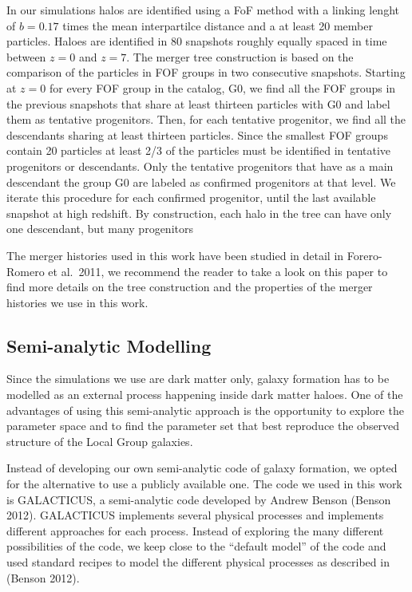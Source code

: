 \documentclass[useAMS,usenatbib]{mn2e}
\newcommand{\etal}{et al.~}
\begin{document}
In our simulations halos are identified using a FoF method with a
linking lenght of $b=0.17$ times the mean interpartilce distance and a
at least 20 member particles. Haloes are identified in 80 snapshots
roughly equally spaced in time between $z=0$ and $z=7$. The merger
tree construction is based on the comparison of the particles in FOF
groups in two consecutive snapshots. Starting at $z=0$ for every FOF
group in the catalog, G0, we find all the FOF groups in the previous
snapshots that share at least thirteen particles with G0 and label
them as tentative progenitors. Then, for each tentative progenitor, we
find all the descendants sharing at least thirteen particles. Since
the smallest FOF groups contain 20 particles at least 2/3 of the
particles must be identified in tentative progenitors or
descendants. Only the tentative progenitors that have as a main
descendant the group G0 are labeled as confirmed progenitors at that
level. We iterate this procedure for each confirmed progenitor, until
the last available snapshot at high redshift. By construction, each
halo in the tree can have only one descendant, but many progenitors

The merger histories used in this work have been studied in detail in
Forero-Romero \etal 2011, we recommend the reader to take a look on
this paper to find more details on the tree construction and the
properties of the merger histories we use in this work.

\subsection{Semi-analytic Modelling} 
\label{sec:sam}

Since the simulations we use are dark matter only, galaxy formation
has to be modelled as an external process happening inside dark matter
haloes. One of the advantages of using this semi-analytic approach is
the opportunity to explore the parameter space and to find the
parameter set that best reproduce the observed structure of the Local
Group galaxies.

Instead of developing our own semi-analytic code of galaxy formation,
we opted for the alternative to use a publicly available one. The code
we used in this work is GALACTICUS, a semi-analytic code developed by
Andrew Benson (Benson 2012). GALACTICUS implements several physical
processes and implements different approaches for each
process. Instead of exploring the many different possibilities of the
code, we keep close to the ``default model'' of the code and used
standard recipes to model the different physical processes as
described in (Benson 2012).
\end{document}
